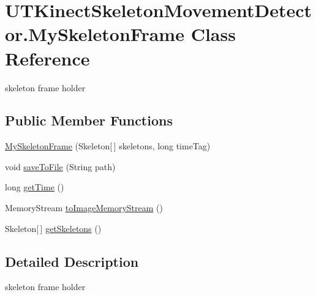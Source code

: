 \hypertarget{class_u_t_kinect_skeleton_movement_detector_1_1_my_skeleton_frame}{\section{U\-T\-Kinect\-Skeleton\-Movement\-Detector.\-My\-Skeleton\-Frame Class Reference}
\label{class_u_t_kinect_skeleton_movement_detector_1_1_my_skeleton_frame}
}


skeleton frame holder  


\subsection*{Public Member Functions}
\begin{DoxyCompactItemize}
\item 
\hyperlink{class_u_t_kinect_skeleton_movement_detector_1_1_my_skeleton_frame_a68103ea84830eb794d0ad718f9b6991a}{My\-Skeleton\-Frame} (Skeleton\mbox{[}$\,$\mbox{]} skeletons, long time\-Tag)
\item 
void \hyperlink{class_u_t_kinect_skeleton_movement_detector_1_1_my_skeleton_frame_af3f9fc03eb13215e4305c572039aeb72}{save\-To\-File} (String path)
\item 
long \hyperlink{class_u_t_kinect_skeleton_movement_detector_1_1_my_skeleton_frame_a755f7df242e36e4e458b808d617cda4c}{get\-Time} ()
\item 
Memory\-Stream \hyperlink{class_u_t_kinect_skeleton_movement_detector_1_1_my_skeleton_frame_a61c75f59bce07a4925d21c55d4a12e01}{to\-Image\-Memory\-Stream} ()
\item 
Skeleton\mbox{[}$\,$\mbox{]} \hyperlink{class_u_t_kinect_skeleton_movement_detector_1_1_my_skeleton_frame_af88bf9afbf8f597fb6ed0087c100918d}{get\-Skeletons} ()
\end{DoxyCompactItemize}


\subsection{Detailed Description}
skeleton frame holder 



